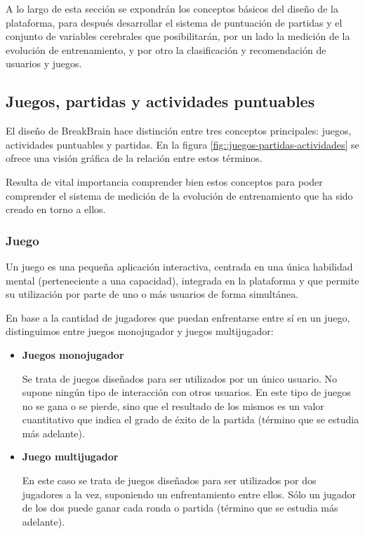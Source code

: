A lo largo de esta sección se expondrán los conceptos básicos del diseño de la plataforma, para después desarrollar el sistema de puntuación de partidas y el conjunto de variables cerebrales que posibilitarán, por un lado la medición de la evolución de entrenamiento, y por otro la clasificación y recomendación de usuarios y juegos.

\subsection{Juegos, partidas y actividades puntuables}
\label{sec::juegos-partidas-actividades}

El diseño de BreakBrain hace distinción entre tres conceptos principales: juegos, actividades puntuables y partidas. En la figura \ref{fig::juegos-partidas-actividades} se ofrece una visión gráfica de la relación entre estos términos.

Resulta de vital importancia comprender bien estos conceptos para poder comprender el sistema de medición de la evolución de entrenamiento que ha sido creado en torno a ellos.

\subsubsection{Juego}

Un juego es una pequeña aplicación interactiva, centrada en una única habilidad mental (perteneciente a una capacidad), integrada en la plataforma y que permite su utilización por parte de uno o más usuarios de forma simultánea.

En base a la cantidad de jugadores que puedan enfrentarse entre sí en un juego, distinguimos entre juegos monojugador y juegos multijugador:

\begin{itemize}
\item {\bf Juegos monojugador}

Se trata de juegos diseñados para ser utilizados por un único usuario. No supone ningún tipo de interacción con otros usuarios. En este tipo de juegos no se gana o se pierde, sino que el resultado de los mismos es un valor cuantitativo que indica el grado de éxito de la partida (término que se estudia más adelante).

\item {\bf Juego multijugador}

En este caso se trata de juegos diseñados para ser utilizados por dos jugadores a la vez, suponiendo un enfrentamiento entre ellos. Sólo un jugador de los dos puede ganar cada ronda o partida (término que se estudia más adelante).

\end{itemize}

